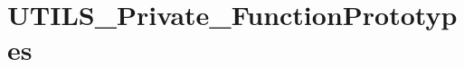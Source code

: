 \hypertarget{group___u_t_i_l_s___private___function_prototypes}{}\section{U\+T\+I\+L\+S\+\_\+\+Private\+\_\+\+Function\+Prototypes}
\label{group___u_t_i_l_s___private___function_prototypes}
